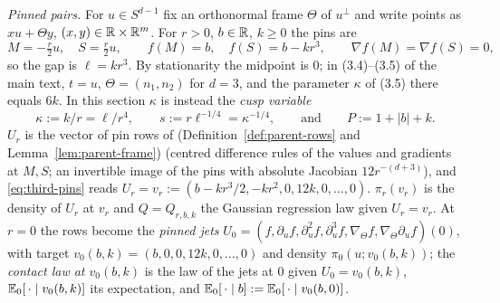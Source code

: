 \emph{Pinned pairs.} For $u\in S^{d-1}$ fix an orthonormal frame $\Theta$ of $u^\perp$ and write points as $xu+\Theta y$, $(x,y)\in\mathbb R\times\mathbb R^m$. For $r>0$, $b\in\mathbb R$, $k\ge0$ the pins are
\begin{equation}\label{eq:third-pins}
M=-\tfrac r2u,\quad S=\tfrac r2u,\qquad f(M)=b,\quad f(S)=b-kr^3,\qquad \nabla f(M)=\nabla f(S)=0,
\end{equation}
so the gap is $\ell=kr^3$. By stationarity the midpoint is $0$; in (3.4)--(3.5) of the main text, $t=u$, $\Theta=(n_1,n_2)$ for $d=3$, and the parameter $\kappa$ of (3.5) there equals $6k$. In this section $\kappa$ is instead the \emph{cusp variable}
\begin{equation}\label{eq:third-cuspvar}
\kappa:=k/r=\ell/r^4,\qquad s:=r\ell^{-1/4}=\kappa^{-1/4},\qquad\text{and}\qquad P:=1+|b|+k.
\end{equation}
$U_r$ is the vector of pin rows of \cite[(3.1)]{parentP} (Definition~\ref{def:parent-rows} and Lemma~\ref{lem:parent-frame}) (centred difference rules of the values and gradients at $M,S$; an invertible image of the pins with absolute Jacobian $12r^{-(d+3)}$), and \eqref{eq:third-pins} reads $U_r=v_r:=(b-kr^3/2,-kr^2,0,12k,0,\dots,0)$. $\pi_r(v_r)$ is the density of $U_r$ at $v_r$ and $Q=Q_{r,b,k}$ the Gaussian regression law given $U_r=v_r$. At $r=0$ the rows become the \emph{pinned jets} $U_0=(f,\partial_uf,\partial_u^2f,\partial_u^3f,\nabla_\Theta f,\nabla_\Theta\partial_uf)(0)$, with target $v_0(b,k)=(b,0,0,12k,0,\dots,0)$ and density $\pi_0(u;v_0(b,k))$; the \emph{contact law at $v_0(b,k)$} is the law of the jets at $0$ given $U_0=v_0(b,k)$, $\mathbb E_0[\,\cdot\mid v_0(b,k)]$ its expectation, and $\mathbb E_0[\,\cdot\mid b]:=\mathbb E_0[\,\cdot\mid v_0(b,0)]$.

